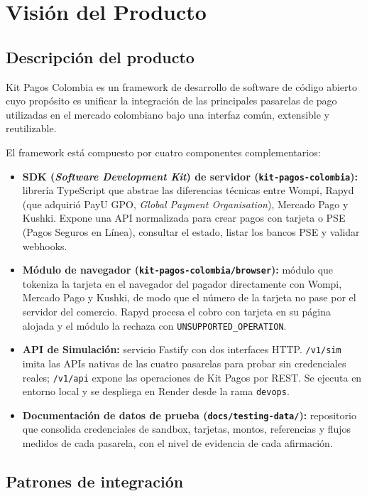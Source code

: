 \section{Visión del Producto}

\subsection{Descripción del producto}

Kit Pagos Colombia es un framework de desarrollo de software de código abierto cuyo propósito es unificar la integración de las principales pasarelas de pago utilizadas en el mercado colombiano bajo una interfaz común, extensible y reutilizable.

El framework está compuesto por cuatro componentes complementarios:

\begin{itemize}
  \item \textbf{SDK (\textit{Software Development Kit}) de servidor (\texttt{kit-pagos-colombia}):} librería TypeScript que abstrae las diferencias técnicas entre Wompi, Rapyd (que adquirió PayU GPO, \textit{Global Payment Organisation}), Mercado Pago y Kushki. Expone una API normalizada para crear pagos con tarjeta o PSE (Pagos Seguros en Línea), consultar el estado, listar los bancos PSE y validar webhooks.
  \item \textbf{Módulo de navegador (\texttt{kit-pagos-colombia/browser}):} módulo que tokeniza la tarjeta en el navegador del pagador directamente con Wompi, Mercado Pago y Kushki, de modo que el número de la tarjeta no pase por el servidor del comercio. Rapyd procesa el cobro con tarjeta en su página alojada y el módulo la rechaza con \texttt{UNSUPPORTED\_OPERATION}.
  \item \textbf{API de Simulación:} servicio Fastify con dos interfaces HTTP. \texttt{/v1/sim} imita las APIs nativas de las cuatro pasarelas para probar sin credenciales reales; \texttt{/v1/api} expone las operaciones de Kit Pagos por REST. Se ejecuta en entorno local y se despliega en Render desde la rama \texttt{devops}.
  \item \textbf{Documentación de datos de prueba (\texttt{docs/testing-data/}):} repositorio que consolida credenciales de sandbox, tarjetas, montos, referencias y flujos medidos de cada pasarela, con el nivel de evidencia de cada afirmación.
\end{itemize}

\subsection{Patrones de integración}

